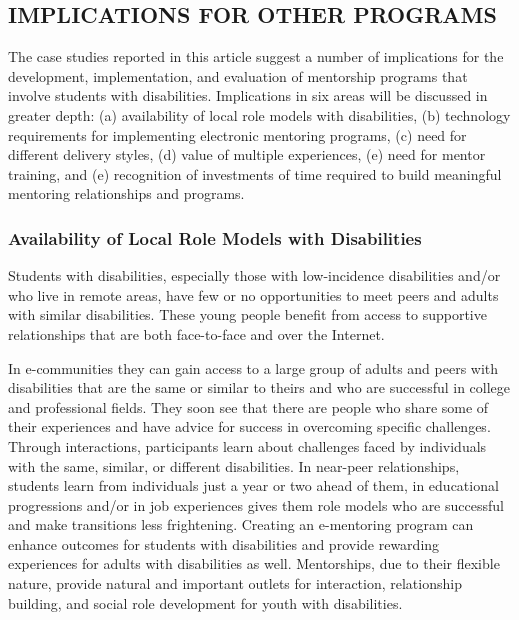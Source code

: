\documentclass[11.5pt]{sig-alternate} %
\begin{document}
\begin{large}
\section*{IMPLICATIONS FOR OTHER PROGRAMS}
The case studies reported in this article suggest a number of implications for the development, implementation, and evaluation of mentorship programs that involve students with disabilities. Implications in six areas will be discussed in greater depth: (a) availability of local role models with disabilities, (b) technology requirements for implementing electronic mentoring programs, (c) need for different delivery styles, (d) value of multiple experiences, (e) need for mentor training, and (e) recognition of investments of time required to build meaningful mentoring relationships and programs.

\subsubsection*{Availability of Local Role Models with Disabilities}
Students with disabilities, especially those with low-incidence disabilities and/or who live in remote areas, have few or no opportunities to meet peers and adults with similar disabilities. These young people benefit from access to supportive relationships that are both face-to-face and over the Internet.

In e-communities they can gain access to a large group of adults and peers with disabilities that are the same or similar to theirs and who are successful in college and professional fields. They soon see that there are people who share some of their experiences and have advice for success in overcoming specific challenges. Through interactions, participants learn about challenges faced by individuals with the same, similar, or different disabilities. In near-peer relationships, students learn from individuals just a year or two ahead of them, in educational progressions and/or in job experiences gives them role models who are successful and make transitions less frightening. Creating an e-mentoring program can enhance outcomes for students with disabilities and provide rewarding experiences for adults with disabilities as well. Mentorships, due to their flexible nature, provide natural and important outlets for interaction, relationship building, and social role development for youth with disabilities.


\end{large}
\end{document}
